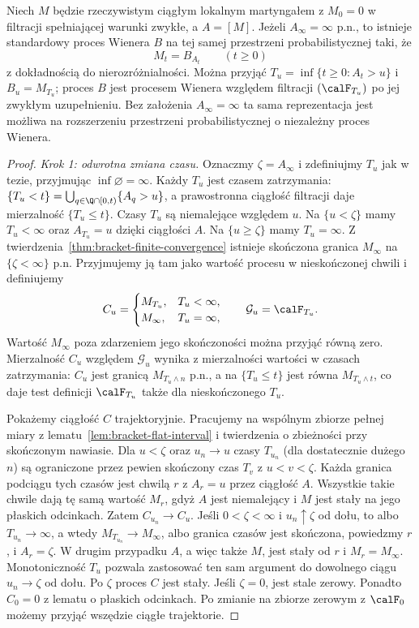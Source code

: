\begin{twierdzenie}
\label{thm:dambis-dubins-schwarz}
Niech $M$ będzie rzeczywistym ciągłym lokalnym
martyngałem z $M_0=0$ w filtracji spełniającej
warunki zwykłe, a $A=[M]$.
Jeżeli $A_\infty=\infty$ p.n., to istnieje
standardowy proces Wienera $B$ na tej samej
przestrzeni probabilistycznej taki, że
\[
M_t=B_{A_t}\qquad(t\ge0)
\]
z dokładnością do nierozróżnialności.
Można przyjąć
$T_u=\inf\{t\ge0:A_t>u\}$ i $B_u=M_{T_u}$;
proces $B$ jest procesem Wienera względem filtracji
$(\calF_{T_u})$ po jej zwykłym uzupełnieniu.
Bez założenia $A_\infty=\infty$ ta sama
reprezentacja jest możliwa na rozszerzeniu
przestrzeni probabilistycznej o niezależny
proces Wienera.
\end{twierdzenie}
\begin{proof}
\emph{Krok 1: odwrotna zmiana czasu.}
Oznaczmy $\zeta=A_\infty$ i zdefiniujmy $T_u$
jak w tezie, przyjmując $\inf\varnothing=\infty$.
Każdy $T_u$ jest czasem zatrzymania:
$\{T_u<t\}=\bigcup_{q\in\Q\cap[0,t)}\{A_q>u\}$,
a prawostronna ciągłość filtracji daje
mierzalność $\{T_u\le t\}$.
Czasy $T_u$ są niemalejące względem $u$.
Na $\{u<\zeta\}$ mamy $T_u<\infty$ oraz
$A_{T_u}=u$ dzięki ciągłości $A$.
Na $\{u\ge\zeta\}$ mamy $T_u=\infty$.
Z twierdzenia~\ref{thm:bracket-finite-convergence}
istnieje skończona granica $M_\infty$
na $\{\zeta<\infty\}$ p.n. Przyjmujemy ją tam
jako wartość procesu w nieskończonej chwili
i definiujemy
\[
C_u=
\begin{cases}
M_{T_u},&T_u<\infty,\\
M_\infty,&T_u=\infty,
\end{cases}
\qquad \mathcal G_u=\calF_{T_u}.
\]
Wartość $M_\infty$ poza zdarzeniem jego
skończoności można przyjąć równą zero.
Mierzalność $C_u$ względem $\mathcal G_u$
wynika z mierzalności wartości w czasach
zatrzymania: $C_u$ jest granicą $M_{T_u\wedge n}$
p.n., a na $\{T_u\le t\}$ jest równa
$M_{T_u\wedge t}$, co daje test definicji
$\calF_{T_u}$ także dla nieskończonego $T_u$.

Pokażemy ciągłość $C$ trajektoryjnie.
Pracujemy na wspólnym zbiorze pełnej miary
z lematu~\ref{lem:bracket-flat-interval}
i twierdzenia o zbieżności przy skończonym nawiasie.
Dla $u<\zeta$ oraz $u_n\to u$ czasy $T_{u_n}$
(dla dostatecznie dużego $n$) są ograniczone
przez pewien skończony czas $T_v$ z $u<v<\zeta$.
Każda granica podciągu tych czasów jest chwilą $r$
z $A_r=u$ przez ciągłość $A$.
Wszystkie takie chwile dają tę samą wartość $M_r$,
gdyż $A$ jest niemalejący i $M$ jest stały na
jego płaskich odcinkach. Zatem $C_{u_n}\to C_u$.
Jeśli $0<\zeta<\infty$ i $u_n\uparrow\zeta$ od dołu,
to albo $T_{u_n}\to\infty$, a wtedy
$M_{T_{u_n}}\to M_\infty$, albo granica czasów
jest skończona, powiedzmy $r$, i $A_r=\zeta$.
W drugim przypadku $A$, a więc także $M$,
jest stały od $r$ i $M_r=M_\infty$.
Monotoniczność $T_u$ pozwala zastosować ten
sam argument do dowolnego ciągu $u_n\to\zeta$
od dołu. Po $\zeta$ proces $C$ jest stały.
Jeśli $\zeta=0$, jest stale zerowy.
Ponadto $C_0=0$ z lematu o płaskich odcinkach.
Po zmianie na zbiorze zerowym z $\calF_0$
możemy przyjąć wszędzie ciągłe trajektorie.


\end{proof}
